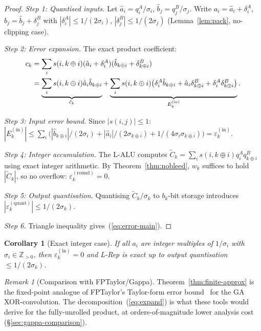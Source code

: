 \documentclass[11pt,a4paper]{article}
\theoremstyle{definition}
\theoremstyle{plain}
\newtheorem{corollary}{Corollary}[section]
\theoremstyle{remark}
\newtheorem{remark}{Remark}[section]
\begin{document}
\begin{proof}
\textit{Step 1: Quantised inputs.}
Let $\hat{a}_i=q_i^A/\sigma_i$, $\hat{b}_j=q_j^B/\sigma_j$.
Write $a_i=\hat{a}_i+\delta_i^A$, $b_j=\hat{b}_j+\delta_j^B$ with
$|\delta_i^A|\le1/(2\sigma_i)$, $|\delta_j^B|\le1/(2\sigma_j)$
(Lemma~\ref{lem:pack}, no-clipping case).

\textit{Step 2: Error expansion.}
The exact product coefficient:
\begin{align}
  c_k &= \sum_i s(i,k\oplus i)(\hat{a}_i+\delta_i^A)(\hat{b}_{k\oplus i}+\delta_{k\oplus i}^B)
  \notag\\
  &= \underbrace{\sum_i s(i,k\oplus i)\hat{a}_i\hat{b}_{k\oplus i}}_{\tilde{c}_k}
   + \underbrace{\sum_i s(i,k\oplus i)\bigl(
     \delta_i^A\hat{b}_{k\oplus i}
     +\hat{a}_i\delta_{k\oplus i}^B
     +\delta_i^A\delta_{k\oplus i}^B\bigr)}_{E_k^{(\mathrm{in})}}.
   \label{eq:expand}
\end{align}

\textit{Step 3: Input error bound.}
Since $|s(i,j)|\le1$:
$|E_k^{(\mathrm{in})}|\le\sum_i\bigl(
  |\hat{b}_{k\oplus i}|/(2\sigma_i)
  +|\hat{a}_i|/(2\sigma_{k\oplus i})
  +1/(4\sigma_i\sigma_{k\oplus i})\bigr)=\varepsilon_k^{(\mathrm{in})}.$

\textit{Step 4: Integer accumulation.}
The L-ALU computes $\tilde{C}_k=\sum_i s(i,k\oplus i)q_i^Aq_{k\oplus i}^B$
using exact integer arithmetic.
By Theorem~\ref{thm:nobleed}, $w_k$ suffices to hold $|\tilde{C}_k|$,
so no overflow: $\varepsilon_k^{(\mathrm{round})}=0$.

\textit{Step 5: Output quantisation.}
Quantising $\tilde{C}_k/\sigma_k$ to $b_k$-bit storage introduces
$|\varepsilon_k^{(\mathrm{quant})}|\le1/(2\sigma_k)$.

\textit{Step 6.} Triangle inequality gives~(\ref{eq:error-main}).
\end{proof}

\begin{corollary}[Exact integer case]
\label{cor:exact}
If all $a_i$ are integer multiples of $1/\sigma_i$ with $\sigma_i\in\mathbb{Z}_{>0}$,
then $\varepsilon_k^{(\mathrm{in})}=0$ and L-Rep is exact up to output
quantisation $\le1/(2\sigma_k)$.
\end{corollary}

\begin{remark}[Comparison with FPTaylor/Gappa]
Theorem~\ref{thm:finite-approx} is the fixed-point analogue of FPTaylor's
Taylor-form error bound~\cite{fptaylor} for the GA XOR-convolution.
The decomposition~(\ref{eq:expand}) is what these tools would derive for
the fully-unrolled product, at orders-of-magnitude lower analysis cost
(\S\ref{sec:gappa-comparison}).
\end{remark}
\end{document}
